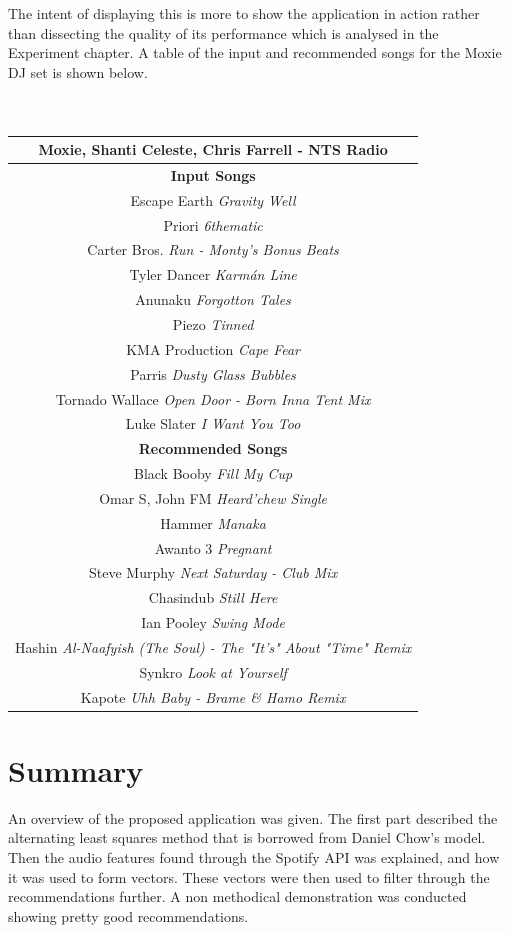 The intent of displaying this is more to show the application in action rather than dissecting the quality of its performance which is analysed in the Experiment chapter. A table of the input and recommended songs for the Moxie DJ set is shown below.
\\
\\
\\
\begin{center}
	\begin{tabular}{ |c|} 
		\hline
		\textbf{Moxie, Shanti Celeste, Chris Farrell - NTS Radio}\\ 
		\hline \textbf{Input Songs}\\ 
		\hline Escape Earth \textit{Gravity Well} \\ 
		\hline Priori \textit{6thematic }\\
		\hline Carter Bros. \textit{Run - Monty's Bonus Beats}\\
		\hline Tyler Dancer \textit{Karmán Line}\\ 
		\hline Anunaku \textit{Forgotton Tales}\\
		\hline Piezo \textit{Tinned}\\
		\hline KMA Production \textit{Cape Fear}\\
		\hline Parris \textit{Dusty Glass Bubbles}\\
		\hline Tornado Wallace \textit{Open Door - Born Inna Tent Mix}\\
		\hline Luke Slater \textit{I Want You Too}\\
		\hline \textbf{Recommended Songs}\\ 
		\hline Black Booby \textit{Fill My Cup}\\
		\hline Omar S, John FM \textit{Heard'chew Single}\\
		\hline Hammer \textit{Manaka}\\
		\hline Awanto 3 \textit{Pregnant}\\
		\hline Steve Murphy \textit{Next Saturday - Club Mix}\\
		\hline Chasindub \textit{Still Here}\\
		\hline Ian Pooley \textit{Swing Mode}\\
		\hline Hashin \textit{Al-Naafyish (The Soul) - The "It's" About "Time" Remix}\\
		\hline Synkro \textit{Look at Yourself}\\
		\hline Kapote \textit{Uhh Baby - Brame \& Hamo Remix}\\
		\hline
	\end{tabular}
\end{center}


\section{Summary}
An overview of the proposed application was given. The first part described the alternating least squares method that is borrowed from Daniel Chow's model. Then the audio features found through the Spotify API was explained, and how it was used to form vectors. These vectors were then used to filter through the recommendations further. A non methodical demonstration was conducted showing pretty good recommendations.


